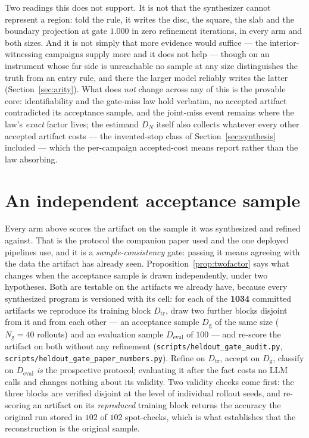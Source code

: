 \documentclass[11pt]{article}
\theoremstyle{definition}
\theoremstyle{remark}
\begin{document}
Two readings this does not support. It is not that the synthesizer cannot represent a region: told the rule, it writes the disc, the square, the slab and the boundary projection at gate $1.000$ in zero refinement iterations, in every arm and both sizes. And it is not simply that more evidence would suffice --- the interior-witnessing campaigns supply more and it does not help --- though on an instrument whose far side is unreachable no sample at any size distinguishes the truth from an entry rule, and there the larger model reliably writes the latter (Section~\ref{sec:arity}). What does \emph{not} change across any of this is the provable core: identifiability and the gate-miss law hold verbatim, no accepted artifact contradicted its acceptance sample, and the joint-miss event remains where the law's \emph{exact} factor lives; the estimand $D_N$ itself also collects whatever every other accepted artifact costs --- the invented-stop class of Section~\ref{sec:synthesis} included --- which the per-campaign accepted-cost means report rather than the law absorbing.

\section{An independent acceptance sample}
\label{sec:heldout}

Every arm above scores the artifact on the sample it was synthesized and refined against. That is the protocol the companion paper used and the one deployed pipelines use, and it is a \emph{sample-consistency} gate: passing it means agreeing with the data the artifact has already seen. Proposition~\ref{prop:twofactor} says what changes when the acceptance sample is drawn independently, under two hypotheses. Both are testable on the artifacts we already have, because every synthesized program is versioned with its cell: for each of the \textbf{1034} committed artifacts we reproduce its training block $D_{\mathrm{tr}}$, draw two further blocks disjoint from it and from each other --- an acceptance sample $D_{\mathrm{g}}$ of the same size ($N_{\mathrm{g}} = 40$ rollouts) and an evaluation sample $D_{\mathrm{eval}}$ of $100$ --- and re-score the artifact on both without any refinement (\texttt{scripts/\allowbreak heldout\_\allowbreak gate\_\allowbreak audit.py}, \texttt{scripts/\allowbreak heldout\_\allowbreak gate\_\allowbreak paper\_\allowbreak numbers.py}). Refine on $D_{\mathrm{tr}}$, accept on $D_{\mathrm{g}}$, classify on $D_{\mathrm{eval}}$ \emph{is} the prospective protocol; evaluating it after the fact costs no LLM calls and changes nothing about its validity. Two validity checks come first: the three blocks are verified disjoint at the level of individual rollout seeds, and re-scoring an artifact on its \emph{reproduced} training block returns the accuracy the original run stored in $102$ of $102$ spot-checks, which is what establishes that the reconstruction is the original sample.
\end{document}
